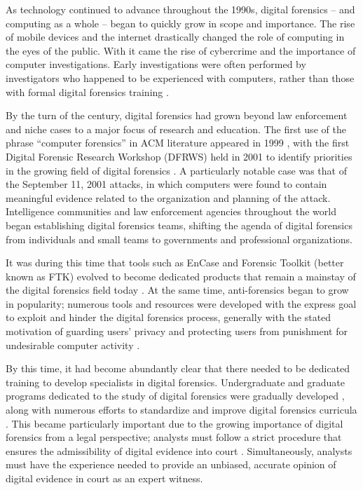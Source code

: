 As technology continued to advance throughout the 1990s, digital
forensics -- and computing as a whole -- began to quickly grow in scope
and importance. The rise of mobile devices and the internet drastically
changed the role of computing in the eyes of the public. With it came
the rise of cybercrime and the importance of computer investigations.
Early investigations were often performed by investigators who happened
to be experienced with computers, rather than those with formal digital
forensics training \cite{hargreavesDigitalForensicsEducation2017}.

By the turn of the century, digital forensics had grown beyond law
enforcement and niche cases to a major focus of research and education.
The first use of the phrase ``computer forensics'' in ACM literature
appeared in 1999 \cite{cooperStandardsDigitalForensics2010}, with
the first Digital Forensic Research Workshop (DFRWS) held in 2001 to
identify priorities in the growing field of digital forensics
\cite{palmerRoadMapDigital2001}. A particularly notable case was
that of the September 11, 2001 attacks, in which computers were found to
contain meaningful evidence related to the organization and planning of
the attack. Intelligence communities and law enforcement agencies
throughout the world began establishing digital forensics teams,
shifting the agenda of digital forensics from individuals and small
teams to governments and professional organizations.

It was during this time that tools such as EnCase and Forensic Toolkit
(better known as FTK) evolved to become dedicated products that remain a
mainstay of the digital forensics field today
\cite{pollittHistoryDigitalForensics2010}. At the same time,
anti-forensics began to grow in popularity; numerous tools and resources
were developed with the express goal to exploit and hinder the digital
forensics process, generally with the stated motivation of guarding
users' privacy and protecting users from punishment for undesirable
computer activity
\cite{geigerEvaluatingCommercialCounterForensic2005,harrisArrivingAntiforensicsConsensus2006}.

By this time, it had become abundantly clear that there needed to be
dedicated training to develop specialists in digital forensics.
Undergraduate and graduate programs dedicated to the study of digital
forensics were gradually developed
\cite{andersonComparativeStudyTeaching2006}, along with numerous
efforts to standardize and improve digital forensics curricula
\cite{cooperStandardsDigitalForensics2010,nanceDigitalForensicsDefining2009,nanceDigitalForensicsDefining2010}.
This became particularly important due to the growing importance of
digital forensics from a legal perspective; analysts must follow a
strict procedure that ensures the admissibility of digital evidence into
court \cite{conklinComputerForensics2022}. Simultaneously, analysts
must have the experience needed to provide an unbiased, accurate opinion
of digital evidence in court as an expert witness.


